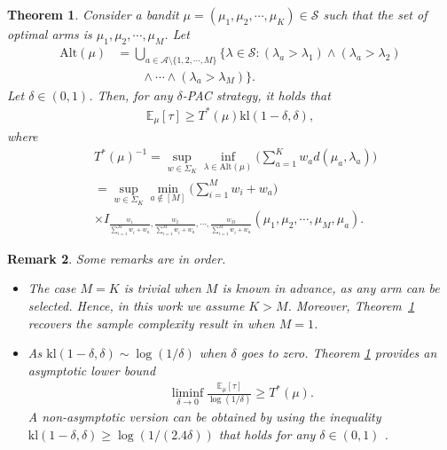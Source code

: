 \documentclass[final]{IEEEtran}
\newcommand{\nn}{\nonumber}
\newcommand{\calA}{\mathcal{A}}
\newcommand{\calS}{\mathcal{S}}
\newcommand{\bbE}{\mathbb{E}}
\newtheorem{theorem}{Theorem}
\newtheorem{remark}[theorem]{Remark}
\begin{document}
\begin{theorem} \label{thm:lowbound} Consider a bandit $\mu=(\mu_1,\mu_2,\cdots, \mu_K) \in \calS$ such that the set of optimal arms is $\mu_1,\mu_2,\cdots,\mu_M$. 
Let
\begin{align}
\text{Alt}(\mu)&=\bigcup_{a\in \calA \setminus \{1,2,\cdots,M\}}\big\{\lambda \in \calS: (\lambda_a > \lambda_1) \wedge (\lambda_a >\lambda_2) \nn\\
&\qquad \wedge \cdots \wedge (\lambda_a>\lambda_M)\}. 
\end{align}
Let $\delta \in (0,1)$. Then, for any $\delta$-PAC strategy, it holds that
\begin{align}
\bbE_{\mu} [\tau]\geq T^*(\mu) \text{kl}(1-\delta, \delta),
\end{align} where
\begin{align}
&T^*(\mu)^{-1}=\sup_{w \in \Sigma_K} \inf_{\lambda \in \text{Alt}(\mu)} \bigg(\sum_{a=1}^K w_a d(\mu_a,\lambda_a)\bigg)\label{eqtami1} \\
&=\sup_{w \in \Sigma_K}\min_{a \notin [M]} \bigg(\sum_{i=1}^M w_i+w_a\bigg)\nn\\
& \times I_{\frac{w_1}{\sum_{i=1}^M w_i+w_a}, \frac{w_2}{\sum_{i=1}^M w_i+w_a}, \cdots, \frac{w_M}{\sum_{i=1}^M w_i +w_a}}(\mu_1,\mu_2,\cdots, \mu_M, \mu_a) \label{eqtami2}. 
\end{align}
\end{theorem}
\begin{remark} Some remarks are in order.
\begin{itemize}
\item The case $M = K$ is trivial when $M$ is known in advance, as any arm can be selected. Hence, in this work we assume $K > M$. Moreover, Theorem~\ref{thm:lowbound} recovers the sample complexity result in \cite[Lemma 3]{garivier2016optimal} when $M = 1$.
\item As $\text{kl}(1-\delta, \delta) \sim \log(1/\delta)$ when $\delta$ goes to zero. Theorem \ref{thm:lowbound} provides an asymptotic lower bound
\begin{align}
\liminf_{\delta \to 0}\frac{\bbE_{\mu} [\tau]}{\log(1/\delta)} \geq T^*(\mu). 
\end{align}
A non-asymptotic version can be obtained by using the inequality $\text{kl}(1-\delta, \delta)\geq \log(1/(2.4\delta))$ that holds for any $\delta \in (0,1)$ \cite{garivier2016optimal}. 
\end{itemize}
\end{remark}
\end{document}
